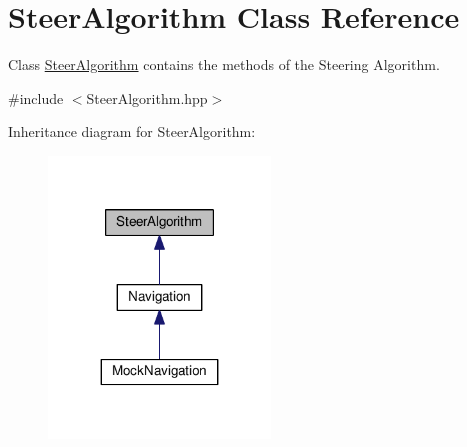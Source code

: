 \hypertarget{class_steer_algorithm}{}\section{Steer\+Algorithm Class Reference}
\label{class_steer_algorithm}


Class \hyperlink{class_steer_algorithm}{Steer\+Algorithm} contains the methods of the Steering Algorithm.  




{\ttfamily \#include $<$Steer\+Algorithm.\+hpp$>$}



Inheritance diagram for Steer\+Algorithm\+:
\nopagebreak
\begin{figure}[H]
\begin{center}
\leavevmode
\includegraphics[width=167pt]{class_steer_algorithm__inherit__graph}
\end{center}
\end{figure}
